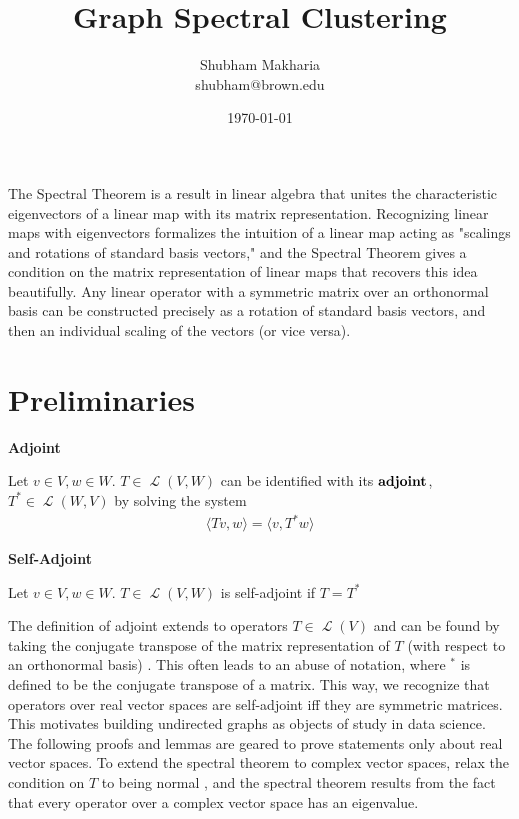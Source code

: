 \documentclass[letterpaper,12pt]{article}
\newcommand{\langlerangle}[1]{\langle{#1}\rangle}
\newcommand{\linearoperator}[1]{\operatorname{\mathcal{L}}(#1)}
\newcommand{\an}[1]{{\leavevmode\color{red}{#1}}}
\begin{document}
\title{Graph Spectral Clustering}
\author{Shubham Makharia \\shubham@brown.edu}
\date{\today}
\maketitle
The Spectral Theorem is a result in linear algebra that unites the characteristic eigenvectors of a linear map with its matrix representation. Recognizing linear maps with eigenvectors formalizes the intuition of a linear map acting as "scalings and rotations of standard basis vectors," and the Spectral Theorem gives a condition on the matrix representation of linear maps that recovers this idea beautifully. Any linear operator with a symmetric matrix over an orthonormal basis can be constructed precisely as a rotation of standard basis vectors, and then an individual scaling of the vectors (or vice versa). 

\section*{Preliminaries}

\noindent
\textbf{Adjoint}

\noindent
Let $v \in V, w \in W$. $T \in \linearoperator{V,W}$ can be identified with its $\bf{adjoint}$, $T^* \in \linearoperator{W,V}$ by solving the system
\begin{align}
    \langlerangle{Tv,w}=\langlerangle{v,T^{*}w}
\end{align}
\an{What is $V$? $W$? What does $\linearoperator{\cdot,\cdot}$ mean? What is $\left\langle \cdot, \cdot \right\rangle$?}

\noindent
\textbf{Self-Adjoint}

\noindent
Let $v \in V, w \in W$. $T \in \linearoperator{V,W}$ is self-adjoint if $ T=T^*$


\noindent The definition of adjoint extends to operators $T \in \linearoperator{V}$ and can be found by taking the conjugate transpose of the matrix representation of $T$ (with respect to an orthonormal basis) . \an{The previous sentence doesn't really make sense to me. ``can be found with respect to an orthonormal basis"?}This often leads to an abuse of notation, where $^{*}$ is defined to be the conjugate transpose of a matrix. This way, we recognize that operators over real vector spaces are self-adjoint iff they are symmetric matrices. This motivates building undirected graphs as objects of study in data science. \an{Well, you haven't motivated this yet; graphs have nothing to do with anything yet.} The following proofs and lemmas are geared to prove statements only about real vector spaces. To extend the spectral theorem to complex vector spaces, relax the condition on $T$ to being normal \an{(The complex-valued analogue of a real symmetric matrix is a normal one?}, and the spectral theorem results from the fact that every operator over a complex vector space has an eigenvalue.\an{I don't really think it follows form this fact.}
\end{document}
